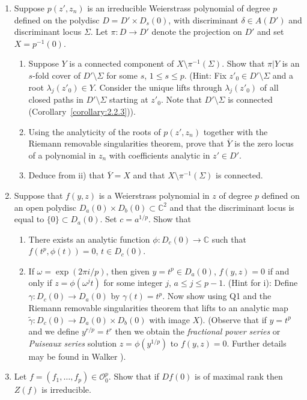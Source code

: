 \begin{enumerate}
\item Suppose $p(z',z_n)$ is an irreducible Weierstrass polynomial of degree $p$ defined on the polydisc $D=D'\times D_s(0)$, with discriminant $\delta\in A(D')$ and discriminant locus $\Sigma$. Let $\pi:D\to D'$ denote the projection on $D'$ and set $X=p^{-1}(0)$.
\begin{enumerate}
\item[i)] Suppose $Y$ is a connected component of $X\setminus\pi^{-1}(\Sigma)$. Show that $\pi|Y$ is an $s$-fold cover of $D'\setminus\Sigma$ for some $s$, $1\leq s\leq p$. (Hint: Fix $z'_0\in D'\setminus\Sigma$ and a root $\lambda_j(z'_0)\in Y$. Consider the unique lifts through $\lambda_j(z'_0)$ of all closed paths in $D'\setminus\Sigma$ starting at $z'_0$. Note that $D'\setminus\Sigma$ is connected (Corollary~\ref{corollary:2.2.3})).
\item[ii)] Using the analyticity of the roots of $p(z',z_n)$ together with the Riemann removable singularities theorem, prove that $\overline Y$ is the zero locus of a polynomial in $z_n$ with coefficients analytic in $z'\in D'$.
\item[iii)] Deduce from ii) that $\overline Y=X$ and that $X\setminus\pi^{-1}(\Sigma)$ is connected.
\end{enumerate}
\item Suppose that $f(y,z)$ is a Weierstrass polynomial in $z$ of degree $p$ defined on an open polydisc $D_a(0)\times D_b(0)\subset\mathbb C^2$ and that the discriminant locus is equal to $\{0\}\subset D_a(0)$. Set $c=a^{1/p}$. Show that
\begin{enumerate}
\item[i)] There exists an analytic function $\phi:D_c(0)\to\mathbb C$ such that $f(t^p,\phi(t))=0$, $t\in D_c(0)$.
\item[ii)] If $\omega=\exp(2\pi i/p)$, then given $y=t^p\in D_a(0)$, $f(y,z)=0$ if and only if $z=\phi(\omega^jt)$ for some integer $j$, $a\leq j\leq p-1$. (Hint for i): Define $\gamma:D_c(0)\to D_a(0)$ by $\gamma(t)=t^p$. Now show using Q1 and the Riemann removable singularities theorem that lifts to an analytic map $\widetilde\gamma:D_c(0)\to D_a(0)\times D_b(0)$ with image $X$). (Observe that if $y=t^p$ and we define $y^{r/p}=t^r$ then we obtain the \emph{fractional power series} or \emph{Puiseaux series} solution $z=\phi(y^{1/p})$ to $f(y,z)=0$. Further details may be found in Walker \cite{bib:I:walker-r:1}).
\end{enumerate}
\item Let $f=(f_1,\ldots,f_p)\in\mathcal O_0^p$. Show that if $Df(0)$ is of maximal rank then $Z(f)$ is irreducible.
\end{enumerate}
